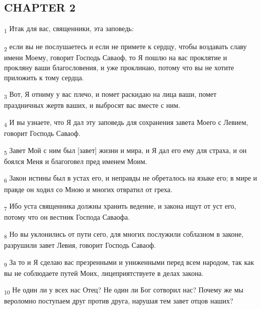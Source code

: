\subsection{CHAPTER 2}
\begin{tcolorbox}
\textsubscript{1} Итак для вас, священники, эта заповедь:
\end{tcolorbox}
\begin{tcolorbox}
\textsubscript{2} если вы не послушаетесь и если не примете к сердцу, чтобы воздавать славу имени Моему, говорит Господь Саваоф, то Я пошлю на вас проклятие и прокляну ваши благословения, и уже проклинаю, потому что вы не хотите приложить к тому сердца.
\end{tcolorbox}
\begin{tcolorbox}
\textsubscript{3} Вот, Я отниму у вас плечо, и помет раскидаю на лица ваши, помет праздничных жертв ваших, и выбросят вас вместе с ним.
\end{tcolorbox}
\begin{tcolorbox}
\textsubscript{4} И вы узнаете, что Я дал эту заповедь для сохранения завета Моего с Левием, говорит Господь Саваоф.
\end{tcolorbox}
\begin{tcolorbox}
\textsubscript{5} Завет Мой с ним был [завет] жизни и мира, и Я дал его ему для страха, и он боялся Меня и благоговел пред именем Моим.
\end{tcolorbox}
\begin{tcolorbox}
\textsubscript{6} Закон истины был в устах его, и неправды не обреталось на языке его; в мире и правде он ходил со Мною и многих отвратил от греха.
\end{tcolorbox}
\begin{tcolorbox}
\textsubscript{7} Ибо уста священника должны хранить ведение, и закона ищут от уст его, потому что он вестник Господа Саваофа.
\end{tcolorbox}
\begin{tcolorbox}
\textsubscript{8} Но вы уклонились от пути сего, для многих послужили соблазном в законе, разрушили завет Левия, говорит Господь Саваоф.
\end{tcolorbox}
\begin{tcolorbox}
\textsubscript{9} За то и Я сделаю вас презренными и униженными перед всем народом, так как вы не соблюдаете путей Моих, лицеприятствуете в делах закона.
\end{tcolorbox}
\begin{tcolorbox}
\textsubscript{10} Не один ли у всех нас Отец? Не один ли Бог сотворил нас? Почему же мы вероломно поступаем друг против друга, нарушая тем завет отцов наших?
\end{tcolorbox}
